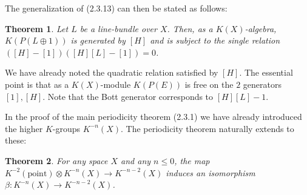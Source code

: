 \documentclass[leqno]{book}
\numberwithin{equation}{section}
\newtheorem{theorem}{Theorem}[section]%
\theoremstyle{definition}
\begin{document}
            The generalization of (2.3.13) can then be stated as follows:

            \begin{theorem}
              Let $L$ be a line-bundle over $X$. Then, as a $K(X)$-algebra, $K(P(L\oplus 1))$ is generated by $[H]$ and is subject to the single relation $([H]-[1])([H][L]-[1])=0$.
            \end{theorem}

            We have already noted the quadratic relation satisfied by $[H]$. The essential point is that as a $K(X)$-module $K(P(E))$ is free on the $2$ generators $[1],[H]$. Note that the Bott generator corresponds to $[H][L]-1$.

            In the proof of the main periodicity theorem (2.3.1) we have already introduced the higher $K$-groups $K^{-n}(X)$. The periodicity theorem naturally extends to these:

            \begin{theorem}
              For any space $X$ and any $n\le 0$, the map $K^{-2}(\text{point})\otimes K^{-n}(X)\to K^{-n-2}(X)$ induces an isomorphism $\beta:K^{-n}(X)\to K^{-n-2}(X)$.
            \end{theorem}
\end{document}
